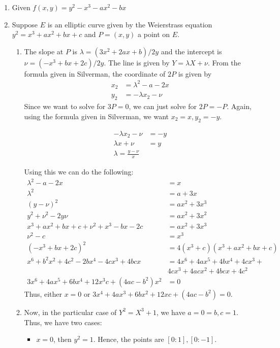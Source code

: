 \documentclass[oneside, 12pt, ]{article}
\begin{document}
\begin{enumerate}
\item Given $f(x,y) = y^2 - x^3 - ax^2 - bx$ \\



\item Suppose $E$ is an elliptic curve given by the Weierstrass equation $y^2 = x^3 + ax^2 + bx + c$ and $P = (x,y)$ a point on $E$.
\begin{enumerate}
\item The slope at $P$ is $\lambda = (3x^2 + 2ax  + b)/2y$ and the intercept is $\nu = (-x^3 + bx + 2c)/2y$. The line is given by $Y = \lambda X + \nu$. From the formula given in Silverman, the coordinate of $2P$ is given by 
\begin{align*}
x_{2} &= \lambda^2 - a - 2x \\
y_{2} &= -\lambda x_{2} - \nu
\end{align*}
Since we want to solve for $3P=0$, we can just solve for $2P=-P$. Again, using the formula given in Silverman, we want $x_{2}=x, y_{2} = -y$. 

\begin{align*}
- \lambda x_{2} - \nu &= -y \\
\lambda x + \nu &= y\\
\lambda = \frac{y - \nu}{x}
\end{align*}

Using this we can do the following: 
\begin{align*}
\lambda^2 - a - 2x &= x\\
\lambda^2 &= a + 3x \\
(y-\nu)^2 &= ax^2 + 3x^3 \\
y^2 + \nu^2 - 2y\nu &= ax^2 + 3x^2 \\
x^3 + ax^2 + bx + c + \nu^2 + x^3 - bx -2c &= ax^2 + 3x^3 \\
\nu^2 - c &= x^3 \\
(-x^3 + bx + 2c)^2 &= 4(x^3 + c)(x^3 + ax^2 + bx + c) \\
x^6 + b^2x^2 + 4c^2 - 2bx^4 - 4cx^3 + 4bcx &= 4x^6 + 4ax^5 
+  4bx^4 + 4cx^3 +\\& 4cx^3 + 4acx^2 + 4bcx + 4c^2 \\
3x^6 + 4ax^5 + 6bx^4 + 12x^3c + (4ac - b^2)x^2 &=0
\end{align*}
Thus, either $x=0$ or $3x^4 + 4ax^3 + 6bx^2 + 12xc + (4ac - b^2) = 0$. 

\item Now, in the particular case of $Y^2 = X^3 + 1$, we have $a=0=b, c=1$. Thus, we have two cases: 
\begin{itemize}
\item $x=0$, then $y^2=1$. Hence, the points are $[0:1], [0:-1]$.


\end{itemize}
\end{enumerate}
\end{enumerate}
\end{document}
